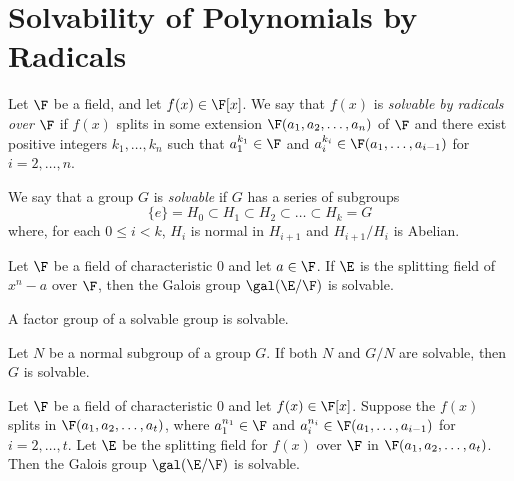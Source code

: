 \section{Solvability of Polynomials by Radicals}

\begin{definition}
	Let $\F$ be a field, and let $f(x) \in \F[x]$. We say that $f(x)$ is \textit{solvable by radicals over $\F$} if $f(x)$ splits in some extension $\F(a_1,a_2,\dots,a_n)$ of $\F$ and there exist positive integers $k_1,\dots,k_n$ such that $a_1^{k_1} \in \F$ and $a_i^{k_i} \in \F(a_1,\dots,a_{i-1})$ for $i=2,\dots,n$.
\end{definition}

\begin{definition}
	We say that a group $G$ is \textit{solvable} if $G$ has a series of subgroups
	\[ \{e\} = H_0 \subset H_1 \subset H_2 \subset \dots \subset H_k = G \]
	where, for each $0 \leq i <k$, $H_i$ is normal in $H_{i + 1}$ and $H_{i + 1}/H_i$ is Abelian.
\end{definition}

\begin{theorem}
	Let $\F$ be a field of characteristic 0 and let $a \in \F$. If $\E$ is the splitting field of $x^n-a$ over $\F$, then the Galois group $\gal(\E/\F)$ is solvable.
\end{theorem}

\begin{theorem}
	A factor group of a solvable group is solvable.
\end{theorem}

\begin{theorem}
	Let $N$ be a normal subgroup of a group $G$. If both $N$ and $G/N$ are solvable, then $G$ is solvable.
\end{theorem}

\begin{theorem}
	Let $\F$ be a field of characteristic 0 and let $f(x) \in \F[x]$. Suppose the $f(x)$ splits in $\F(a_1,a_2,\dots,a_t)$, where $a_1^{n_1} \in \F$ and $a_i^{n_i} \in \F(a_1,\dots,a_{i-1})$ for $i=2,\dots,t$. Let $\E$ be the splitting field for $f(x)$ over $\F$ in $\F(a_1,a_2,\dots,a_t)$. Then the Galois group $\gal(\E/\F)$ is solvable.
\end{theorem}
